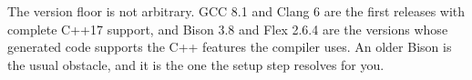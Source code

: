The version floor is not arbitrary. GCC 8.1 and Clang 6 are the first releases with complete C++17 support, and Bison 3.8 and Flex 2.6.4 are the versions whose generated code supports the C++ features the compiler uses. An older Bison is the usual obstacle, and it is the one the setup step resolves for you.
